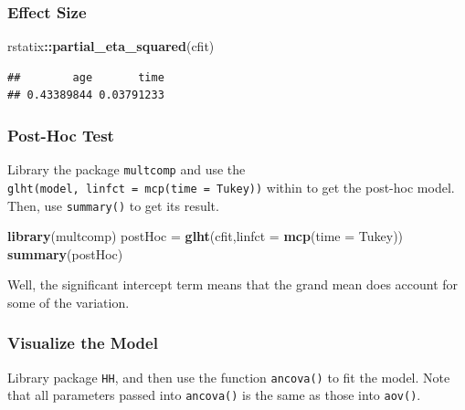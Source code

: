 \documentclass[
]{ctexart}
\newenvironment{Shaded}{\begin{snugshade}}{\end{snugshade}}
\newcommand{\AttributeTok}[1]{\textcolor[rgb]{0.13,0.29,0.53}{#1}}
\newcommand{\FunctionTok}[1]{\textcolor[rgb]{0.13,0.29,0.53}{\textbf{#1}}}
\newcommand{\NormalTok}[1]{#1}
\newcommand{\OtherTok}[1]{\textcolor[rgb]{0.56,0.35,0.01}{#1}}
\newcommand{\SpecialCharTok}[1]{\textcolor[rgb]{0.81,0.36,0.00}{\textbf{#1}}}
\newcommand{\StringTok}[1]{\textcolor[rgb]{0.31,0.60,0.02}{#1}}
\begin{document}
\hypertarget{effect-size-1}{%
\subsubsection{Effect Size}\label{effect-size-1}}

\begin{Shaded}
\begin{Highlighting}[]
\NormalTok{rstatix}\SpecialCharTok{::}\FunctionTok{partial\_eta\_squared}\NormalTok{(cfit)}
\end{Highlighting}
\end{Shaded}

\begin{verbatim}
##        age       time 
## 0.43389844 0.03791233
\end{verbatim}

\hypertarget{post-hoc-test}{%
\subsubsection{Post-Hoc Test}\label{post-hoc-test}}

Library the package \texttt{multcomp} and use the
\texttt{glht(model,\ linfct\ =\ mcp(time\ =\ \textquotesingle{}Tukey\textquotesingle{}))}
within to get the post-hoc model. Then, use \texttt{summary()} to get
its result.

\begin{Shaded}
\begin{Highlighting}[]
\FunctionTok{library}\NormalTok{(multcomp)}
\NormalTok{postHoc }\OtherTok{=} \FunctionTok{glht}\NormalTok{(cfit,}\AttributeTok{linfct =} \FunctionTok{mcp}\NormalTok{(}\AttributeTok{time =} \StringTok{\textquotesingle{}Tukey\textquotesingle{}}\NormalTok{))}
\FunctionTok{summary}\NormalTok{(postHoc)}
\end{Highlighting}
\end{Shaded}

Well, the significant intercept term means that the grand mean does
account for some of the variation.

\hypertarget{visualize-the-model}{%
\subsubsection{Visualize the Model}\label{visualize-the-model}}

Library package \texttt{HH}, and then use the function \texttt{ancova()}
to fit the model. Note that all parameters passed into \texttt{ancova()}
is the same as those into \texttt{aov()}.
\end{document}
